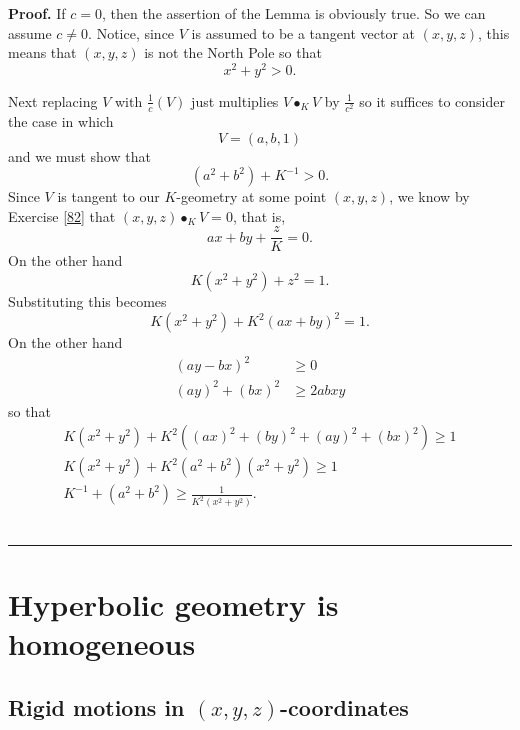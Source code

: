 \documentclass{article}%
\newenvironment{proof}[1][Proof]{\noindent\textbf{#1.} }{\ \rule{0.5em}{0.5em}}
\begin{document}
\begin{proof}
If $c=0$, then the assertion of the Lemma is obviously true. So we can assume
$c\neq0$. Notice, since $V$ is assumed to be a tangent vector at $\left(
x,y,z\right)  $, this means that $\left(  x,y,z\right)  $ is not the North
Pole so that
\[
x^{2}+y^{2}>0.
\]


Next replacing $V$ with $\frac{1}{c}\left(  V\right)  $ just multiplies
$V\bullet_{K}V$ by $\frac{1}{c^{2}}$ so it suffices to consider the case in
which%
\[
V=\left(  a,b,1\right)
\]
and we must show that%
\[
\left(  a^{2}+b^{2}\right)  +K^{-1}>0.
\]
Since $V$ is tangent to our $K$-geometry at some point $\left(  x,y,z\right)
$, we know by Exercise \ref{82} that $\left(  x,y,z\right)  \bullet_{K}V=0$,
that is,%
\[
ax+by+\frac{z}{K}=0.
\]
On the other hand%
\[
K\left(  x^{2}+y^{2}\right)  +z^{2}=1.
\]
Substituting this becomes%
\[
K\left(  x^{2}+y^{2}\right)  +K^{2}\left(  ax+by\right)  ^{2}=1.
\]
On the other hand%
\begin{align*}
\left(  ay-bx\right)  ^{2}  &  \geq0\\
\left(  ay\right)  ^{2}+\left(  bx\right)  ^{2}  &  \geq2abxy
\end{align*}
so that%
\begin{gather*}
K\left(  x^{2}+y^{2}\right)  +K^{2}\left(  \left(  ax\right)  ^{2}+\left(
by\right)  ^{2}+\left(  ay\right)  ^{2}+\left(  bx\right)  ^{2}\right)
\geq1\\
K\left(  x^{2}+y^{2}\right)  +K^{2}\left(  a^{2}+b^{2}\right)  \left(
x^{2}+y^{2}\right)  \geq1\\
K^{-1}+\left(  a^{2}+b^{2}\right)  \geq\frac{1}{K^{2}\left(  x^{2}%
+y^{2}\right)  }.
\end{gather*}
\pagebreak
\end{proof}

\section{Hyperbolic geometry is homogeneous}

\subsection{Rigid motions in $\left(  x,y,z\right)  $-coordinates}
\end{document}
